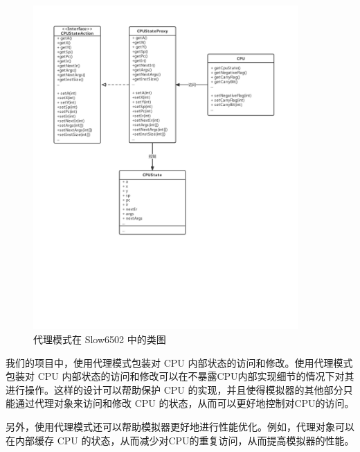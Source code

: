 \begin{figure}[h]
  \centering
  \includegraphics[width=0.9\textwidth]{figures/Proxy.pdf}
  \caption{代理模式在 Slow6502 中的类图}
\end{figure}

我们的项目中，使用代理模式包装对 CPU 内部状态的访问和修改。使用代理模式包装对 CPU 内部状态的访问和修改可以在不暴露CPU内部实现细节的情况下对其进行操作。这样的设计可以帮助保护 CPU 的实现，并且使得模拟器的其他部分只能通过代理对象来访问和修改 CPU 的状态，从而可以更好地控制对CPU的访问。

另外，使用代理模式还可以帮助模拟器更好地进行性能优化。例如，代理对象可以在内部缓存 CPU 的状态，从而减少对CPU的重复访问，从而提高模拟器的性能。

